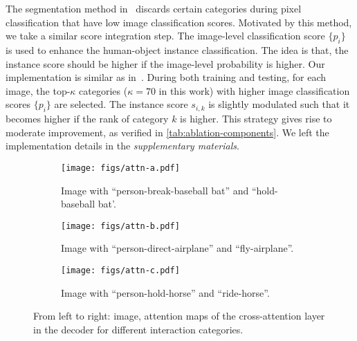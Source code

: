 \documentclass[10pt,twocolumn,letterpaper]{article}
\def\supp{\textit{\textcolor{BrickRed}{supplementary materials}}}
\begin{document}
The segmentation method in~\cite{he2022rankseg} discards certain categories during pixel classification that have low image classification scores. Motivated by this method, we take a similar score integration step. The image-level classification score $\{p_{i}\}$ is used to enhance the human-object instance classification. The idea is that, the instance score should be higher if the image-level probability is higher. Our implementation is similar as in~\cite{he2022rankseg}. During both training and testing, for each image, the top-$\kappa$ categories ($\kappa = 70$ in this work) with higher image classification scores $\{p_{i}\}$ are selected. The instance score $s_{i,k}$ is slightly modulated such that it becomes higher if the rank of category $k$ is higher. This strategy gives rise to moderate improvement, as verified in \cref{tab:ablation-components}. We left the implementation details in the \supp.


\begin{figure}
  \centering
  \begin{subfigure}{\linewidth}
    \texttt{[image: figs/attn-a.pdf]}
    \caption{Image with ``person-break-baseball bat'' and ``hold-baseball bat'.}
    \label{fig:attn-a}
  \end{subfigure}
  \hfill
  \begin{subfigure}{\linewidth}
    \texttt{[image: figs/attn-b.pdf]}
    \caption{Image with ``person-direct-airplane'' and ``fly-airplane''.}
    \label{fig:attn-b}
  \end{subfigure}
  \hfill
  \begin{subfigure}{\linewidth}
    \texttt{[image: figs/attn-c.pdf]}
    \caption{Image with ``person-hold-horse'' and ``ride-horse''.}
    \label{fig:attn-c}
  \end{subfigure}
  \caption{From left to right: image, attention maps of the cross-attention layer in the decoder for different interaction categories.}
  \vspace{-8pt}
  \label{fig:attn}
\end{figure}
\end{document}
